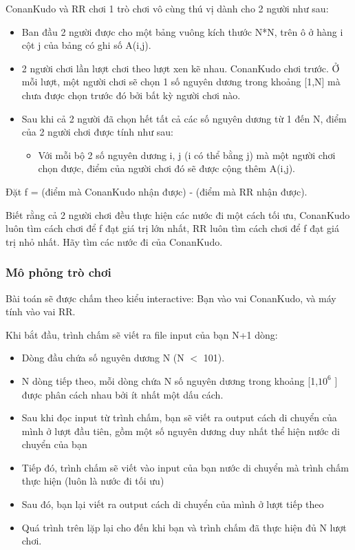 



   ConanKudo và RR chơi 1 trò chơi vô cùng thú vị dành cho 2 người như sau:  
\begin{itemize}
	\item     Ban đầu 2 người được cho một bảng vuông kích thước N*N, trên ô ở hàng i cột j của bảng có ghi số A(i,j).   
	\item     2 người chơi lần lượt chơi theo lượt xen kẽ nhau. ConanKudo chơi trước. Ở mỗi lượt, một người chơi sẽ chọn 1 số nguyên dương trong khoảng [1,N] mà chưa được chọn trước đó bởi bất kỳ người chơi nào.   
	\item     Sau khi cả 2 người đã chọn hết tất cả các số nguyên dương từ 1 đến N, điểm của 2 người chơi được tính như sau:    
\begin{itemize}
	\item       Với mỗi bộ 2 số nguyên dương i, j (i có thể bằng j) mà một người chơi chọn được, điểm của người chơi đó sẽ được cộng thêm A(i,j).     
\end{itemize}
\end{itemize}

   Đặt f = (điểm mà ConanKudo nhận được) - (điểm mà RR nhận được).  

   Biết rằng cả 2 người chơi đều thực hiện các nước đi một cách tối ưu, ConanKudo luôn tìm cách chơi để f đạt giá trị lớn nhất, RR luôn tìm cách chơi để f đạt giá trị nhỏ nhất. Hãy tìm các nước đi của ConanKudo.  

\subsubsection{   Mô phỏng trò chơi  }

   Bài toán sẽ được chấm theo kiểu interactive: Bạn vào vai ConanKudo, và máy tính vào vai RR.  

   Khi bắt đầu, trình chấm sẽ viết ra file input của bạn N+1 dòng:  
\begin{itemize}
	\item     Dòng đầu chứa số nguyên dương N (N $<$ 101).   
	\item     N dòng tiếp theo, mỗi dòng chứa N số nguyên dương trong khoảng [1,$10^{6}$    ] được phân cách nhau bởi ít nhất một dấu cách.   
	\item     Sau khi đọc input từ trình chấm, bạn sẽ viết ra output cách di chuyển của mình ở lượt đầu tiên, gồm một số nguyên dương duy nhất thể hiện nước di chuyển của bạn   
	\item     Tiếp đó, trình chấm sẽ viết vào input của bạn nước di chuyển mà trình chấm thực hiện (luôn là nước đi tối ưu)   
	\item     Sau đó, bạn lại viết ra output cách di chuyển của mình ở lượt tiếp theo   
	\item     Quá trình trên lặp lại cho đến khi bạn và trình chấm đã thực hiện đủ N lượt chơi.   
\end{itemize}

